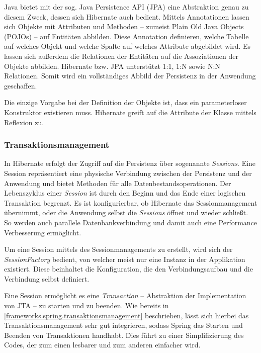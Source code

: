 				Java bietet mit der sog. Java Persistence API (\acs{JPA}) eine Abstraktion genau zu diesem Zweck, dessen sich Hibernate auch bedient. Mittels Annotationen lassen sich Objekte mit Attributen und Methoden -- zumeist Plain Old Java Objects (\acs{POJO}s) -- auf Entitäten abbilden. Diese Annotation definieren, welche Tabelle auf welches Objekt und welche Spalte auf welches Attribute abgebildet wird. Es lassen sich außerdem die Relationen der Entitäten auf die Assoziationen der Objekte abbilden. Hibernate bzw. \acs{JPA} unterstützt 1:1, 1:N sowie N:N Relationen. Somit wird ein vollständiges Abbild der Persistenz in der Anwendung geschaffen.
				
				Die einzige Vorgabe bei der Definition der Objekte ist, dass ein parameterloser Konstruktor existieren muss. Hibernate greift auf die Attribute der Klasse mittels Reflexion zu. 
				
			\subsubsection{Transaktionsmanagement} %
			
				In Hibernate erfolgt der Zugriff auf die Persistenz über sogenannte \textit{Sessions}. Eine Session repräsentiert eine physische Verbindung zwischen der Persistenz und der Anwendung und bietet Methoden für alle Datenbestandsoperationen. Der Lebenszyklus einer \textit{Session} ist durch den Beginn und das Ende einer logischen Transaktion begrenzt. Es ist konfigurierbar, ob Hibernate das Sessionmanagement übernimmt, oder die Anwendung selbst die \textit{Sessions} öffnet und wieder schließt. So werden auch parallele Datenbankverbindung und damit auch eine Performance Verbesserung ermöglicht.
				
				Um eine Session mittels des Sessionmanagements zu erstellt, wird sich der \textit{SessionFactory} bedient, von welcher meist nur eine Instanz in der Applikation existiert. Diese beinhaltet die Konfiguration, die den Verbindungsaufbau und die Verbindung selbst definiert.
				
				Eine Session ermöglicht es eine \textit{Transaction} -- Abstraktion der Implementation von \acs{JTA} -- zu starten und zu beenden. Wie bereits in \autoref{frameworks.spring.transaktionsmanagement} beschrieben, lässt sich hierbei das Transaktionsmanagement sehr gut integrieren, sodass Spring das Starten und Beenden von Transaktionen handhabt. Dies führt zu einer Simplifizierung des Codes, der zum einen lesbarer und zum anderen einfacher wird. 
				
